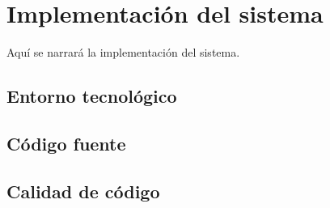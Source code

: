 \chapter{Implementación del sistema}
Aquí se narrará la implementación del sistema.

\section{Entorno tecnológico}


\section{Código fuente}


\section{Calidad de código}